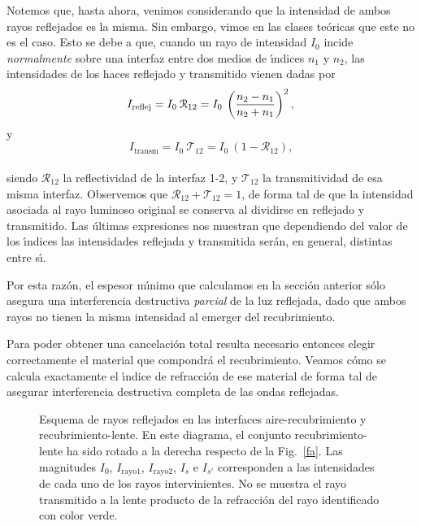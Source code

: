 \documentclass[a4paper]{article}
\begin{document}
Notemos que, hasta ahora, venimos considerando que la intensidad de ambos
rayos reflejados es la misma. Sin embargo, vimos en las clases te\'oricas
que este no es el caso. Esto se debe a que, cuando un rayo de intensidad
$I_0$ incide {\it normalmente} sobre una interfaz entre dos medios de \'\i ndices
$n_1$ y $n_2$, las intensidades de los haces reflejado y transmitido  vienen
dadas por
\begin{equation}
    I_\text{reflej} = I_0 \: \mathcal{R}_{12} = I_0 \: \left( \frac{n_2-n_1}{n_2 + n_1} \right)^2, \\
\end{equation}
y
\begin{equation}
    I_\text{transm} = I_0 \: \mathcal{T}_{12} = I_0 \: (1-\mathcal{R}_{12}),
\end{equation}\\
siendo $\mathcal{R}_{12}$ la reflectividad de la interfaz 1-2, y
$\mathcal{T}_{12}$ la transmitividad de esa misma interfaz. Observemos que 
$\mathcal{R}_{12} + \mathcal{T}_{12} = 1$, de forma tal de que la intensidad 
asociada al rayo luminoso original se conserva al dividirse en reflejado y transmitido. 
Las \'ultimas expresiones nos muestran que dependiendo del valor
de los \'\i ndices las intensidades
reflejada y transmitida ser\'an, en general, distintas entre s\'\i . 

Por esta raz\'on, el espesor m\'\i nimo que calculamos en la secci\'on anterior
s\'olo asegura una interferencia destructiva {\it parcial} de la luz reflejada,
dado que ambos rayos no tienen la misma intensidad al emerger del recubrimiento.

Para poder obtener una cancelaci\'on total resulta necesario entonces elegir
correctamente el material que compondr\'a el recubrimiento. Veamos c\'omo se
calcula exactamente el \'\i ndice de refracci\'on de ese material de forma tal
de asegurar interferencia destructiva completa de las ondas reflejadas.

\begin{figure}
    \centering
    
    \caption{Esquema de rayos reflejados en las interfaces aire-recubrimiento
    y recubrimiento-lente. En este diagrama, el conjunto recubrimiento-lente
    ha sido rotado a la derecha respecto de la Fig.~\ref{fa}. 
    Las magnitudes $I_0$, $I_\text{rayo1}$, 
$I_\text{rayo2}$, $I_{s}$ e $I_{s'}$ corresponden a las intensidades
    de cada uno de los rayos intervinientes.
    No se muestra el rayo transmitido a la lente producto de la 
refracci\'on del rayo identificado con color verde. }
\label{fig:r2}
\end{figure}
\end{document}
